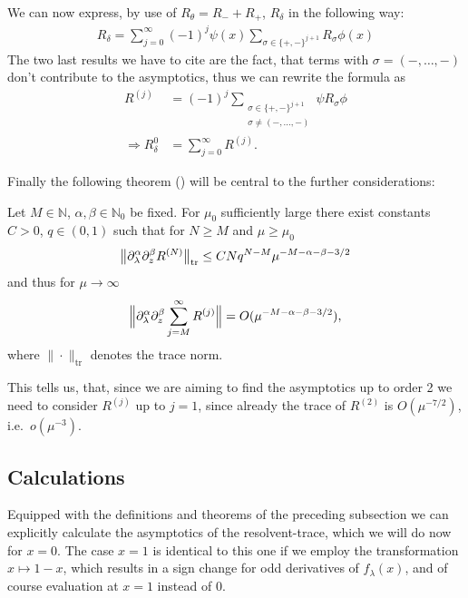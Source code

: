 We can now express, by use of $R_\theta = R_- + R_+$, $R_\delta$ in the
following way:
\begin{align}
  R_\delta = \sum_{j=0}^\infty (-1)^j \psi(x) \sum_{\sigma\in\{+,-\}^{j+1}}
  R_\sigma \phi(x)
\end{align}
The two last results we have to cite are the fact, that terms with $\sigma =
(-,\ldots,-)$ don't contribute to the asymptotics, thus we can rewrite the
formula as
\begin{align}
  R^{(j)} &= (-1)^j \sum_{ \substack{ \sigma\in\{+,-\}^{j+1} \\
  \sigma\neq(-,\ldots,-) } } \psi R_\sigma \phi \\
  \Rightarrow R^0_\delta &= \sum_{j=0}^\infty R^{(j)}.
\end{align}

Finally the following theorem (\cite[Prop 2.2]{LV13}) will be central to the
further considerations:
\begin{Theorem}
  \label{thm:r-expansion}
  Let $M\in\mathbb{N}$, $\alpha,\beta\in\mathbb{N}_0$ be fixed. For $\mu_0$
  sufficiently large there exist constants $C>0$, $q\in(0,1)$ such that for
  $N\geq M$ and $\mu \geq \mu_0$
  \begin{align}
    \Norm[\mathrm{tr}]{\partial_\lambda^\alpha\partial^\beta_z R^{(N)}}
    \leq CNq^{N-M}\mu^{-M-\alpha-\beta-3/2}
  \end{align}
  and thus for $\mu\to\infty$
  \begin{align}
    \Bigl\|\partial^\alpha_\lambda\partial^\beta_z\sum_{j=M}^\infty
    R^{(j)}\Bigr\| = O(\mu^{-M-\alpha-\beta-3/2}),
  \end{align}
  where $\|\cdot\|_{\mathrm{tr}}$ denotes the trace norm.
\end{Theorem}
This tells us, that, since we are aiming to find the asymptotics up to order 2
we need to consider $R^{(j)}$ up to $j=1$, since already the trace of $R^{(2)}$
is $O(\mu^{-7/2})$, i.e.\ $o(\mu^{-3})$.

\subsection{Calculations}
Equipped with the definitions and theorems of the preceding subsection we can
explicitly calculate the asymptotics of the resolvent-trace, which we will do
now for $x=0$. The case $x=1$ is identical to this one if we employ the
transformation $x\mapsto 1-x$, which results in a sign change for odd
derivatives of $f_\lambda(x)$, and of course evaluation at $x=1$ instead of $0$.

